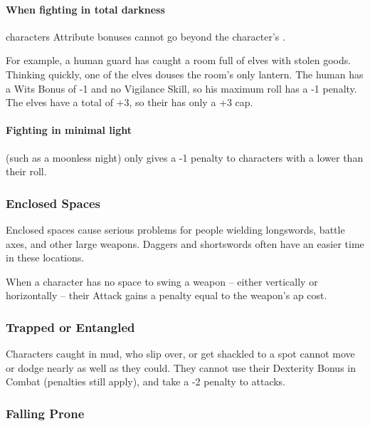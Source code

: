 \begin{multicols}{2}
\paragraph*{When fighting in total darkness}
characters Attribute bonuses cannot go beyond the character's .

\begin{exampletext}
  For example, a human guard has caught a room full of elves with stolen goods.
  Thinking quickly, one of the elves douses the room's only lantern.
  The human has a Wits Bonus of -1 and no Vigilance Skill, so his maximum roll has a -1 penalty.
  The elves have a total  of +3, so their  has only a +3 cap.
\end{exampletext}

\paragraph*{Fighting in minimal light}
(such as a moonless night)
only gives a -1 penalty to characters with a  lower than their roll.

\subsubsection[Enclosed Spaces: Penalty equals weapon's \glsentrytext{ap} cost]{Enclosed Spaces}
\label{enclosedcombat}

Enclosed spaces cause serious problems for people wielding longswords, battle axes, and other large weapons.
Daggers and shortswords often have an easier time in these locations.

When a character has no space to swing a weapon -- either vertically or horizontally -- their Attack gains a penalty equal to the weapon's \gls{ap} cost.

\subsubsection[Trapped/ Entangled: Character cannot use their Dexterity Bonus, and takes -2 Attack penalty]{Trapped or Entangled}
\label{trapped}
\label{entangled}

Characters caught in mud, who slip over, or get shackled to a spot cannot move or dodge nearly as well as they could.
They cannot use their Dexterity Bonus in Combat (penalties still apply), and take a -2 penalty to attacks.

\subsubsection[Falling Prone: -2 penalty when on the ground]{Falling Prone}
\label{prone}


\end{multicols}
